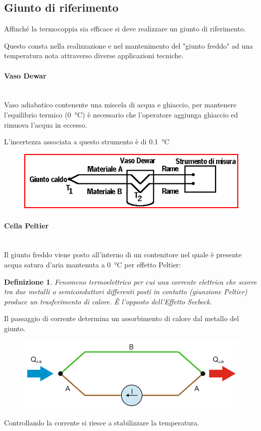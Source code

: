 \documentclass[a4paper, 15pt]{article}
\newtheorem*{definizione}{Definizione}
\begin{document}
\subsection{Giunto di riferimento}
\begin{adjustwidth}{2in}{}	
	Affinché la termocoppia sia efficace si deve realizzare un giunto di riferimento. 
	
	Questo consta nella realizzazione e nel mantenimento del "giunto freddo" ad una temperatura nota attraverso diverse applicazioni tecniche. 
	
	\paragraph{Vaso Dewar} \mbox{} \\
	Vaso adiabatico contenente una miscela di acqua e ghiaccio, per mantenere l'equilibrio termico (\SI{0}{\celsius}) è necessario che l'operatore aggiunga ghiaccio ed rimuova l'acqua in eccesso. 
	
	L'incertezza associata a questo strumento è di \SI{0.1}{\celsius}
	\begin{figure}[H]
		\centering
		\includegraphics[width=0.5\linewidth]{immagini/screenshot027}
		\label{fig:screenshot027}
	\end{figure}
	
	\paragraph{Cella Peltier} \mbox{} \\
	Il giunto freddo viene posto all'interno di un contenitore nel quale è presente acqua satura d'aria mantenuta a \SI{0}{\celsius} per effetto Peltier: 
	\begin{definizione}
		Fenomeno termoelettrico per cui una corrente elettrica che scorre tra due metalli o semiconduttori differenti posti in contatto (giunzione Peltier) produce un trasferimento di calore. È l'opposto dell'Effetto Seebeck. 
	\end{definizione}
	Il passaggio di corrente determina un assorbimento di calore dal metallo del giunto. 
	\begin{figure}[H]
		\centering
		\includegraphics[width=0.5\linewidth]{immagini/screenshot028}
		\label{fig:screenshot028}
	\end{figure}
	 Controllando la corrente si riesce a stabilizzare la temperatura.
\newpage	 

\end{adjustwidth}
\end{document}
